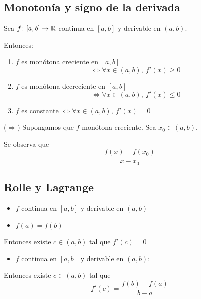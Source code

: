 \documentclass[11pt,a4paper]{article}
\begin{document}
\subsection{Monotonía y signo de la derivada}

\begin{proposicion}
  Sea $f\colon[a,b]\to\mathbb{R}$ continua en $[a,b]$ y derivable en $(a,b)$.

  Entonces:
  \begin{enumerate}[label=(\arabic*)]
    \item $f$ es monótona creciente en $[a,b]$
      \[
        \iff\forall x\in(a,b),\ f'(x)\geq 0
      \]
    \item $f$ es monótona decreciente en $[a,b]$
      \[
        \iff\forall x\in(a,b),\ f'(x)\leq 0
      \]
    \item $f$ es constante $\iff\forall x\in(a,b),\ f'(x)=0$
  \end{enumerate}
\end{proposicion}

\begin{demo}[Demostración de (1)]
  ($\Rightarrow$) Supongamos que $f$ monótona creciente. Sea
  $x_0\in(a,b)$.

  Se observa que
  \[
    \frac{f(x)-f(x_0)}{x-x_0}
  \]
  \renewcommand{\qedsymbol}{}
\end{demo}


\subsection{Rolle y Lagrange}

\begin{lema}[Rolle]\leavevmode
  \begin{itemize}
    \item $f$ continua en $[a,b]$ y derivable en $(a,b)$
    \item $f(a)=f(b)$
  \end{itemize}
  Entonces existe $c\in(a,b)$ tal que $f'(c)=0$
\end{lema}

\begin{teorema}\leavevmode
  \begin{itemize}
    \item $f$ continua en $[a,b]$ y derivable en $(a,b)$:
  \end{itemize}
  Entonces existe $c\in(a,b)$ tal que
  \[
    f'(c)=\frac{f(b)-f(a)}{b-a}
  \]
\end{teorema}
\end{document}
